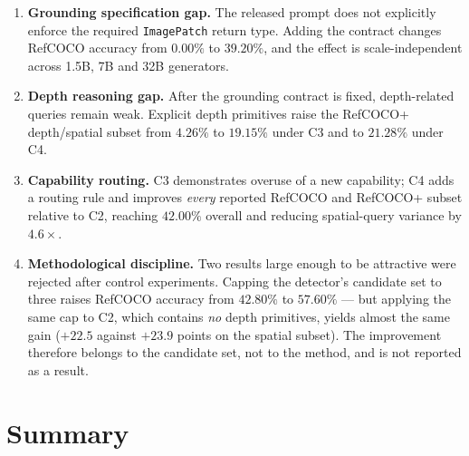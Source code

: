 \documentclass[11pt,a4paper]{article}
\begin{document}
\begin{enumerate}[leftmargin=1.8em, itemsep=5pt]
\item \textbf{Grounding specification gap.} The released prompt does not explicitly
enforce the required \texttt{ImagePatch} return type. Adding the contract changes
RefCOCO accuracy from $0.00\%$ to $39.20\%$, and the effect is scale-independent
across 1.5B, 7B and 32B generators.

\item \textbf{Depth reasoning gap.} After the grounding contract is fixed,
depth-related queries remain weak. Explicit depth primitives raise the RefCOCO+
depth/spatial subset from $4.26\%$ to $19.15\%$ under C3 and to $21.28\%$ under C4.

\item \textbf{Capability routing.} C3 demonstrates overuse of a new capability; C4 adds
a routing rule and improves \emph{every} reported RefCOCO and RefCOCO+ subset relative
to C2, reaching $42.00\%$ overall and reducing spatial-query variance by $4.6\times$.

\item \textbf{Methodological discipline.} Two results large enough to be attractive
were rejected after control experiments. Capping the detector's candidate set to three
raises RefCOCO accuracy from $42.80\%$ to $57.60\%$ --- but applying the same cap to
C2, which contains \emph{no} depth primitives, yields almost the same gain
($+22.5$ against $+23.9$ points on the spatial subset). The improvement therefore
belongs to the candidate set, not to the method, and is not reported as a result.
\end{enumerate}

\section{Summary}
\end{document}

